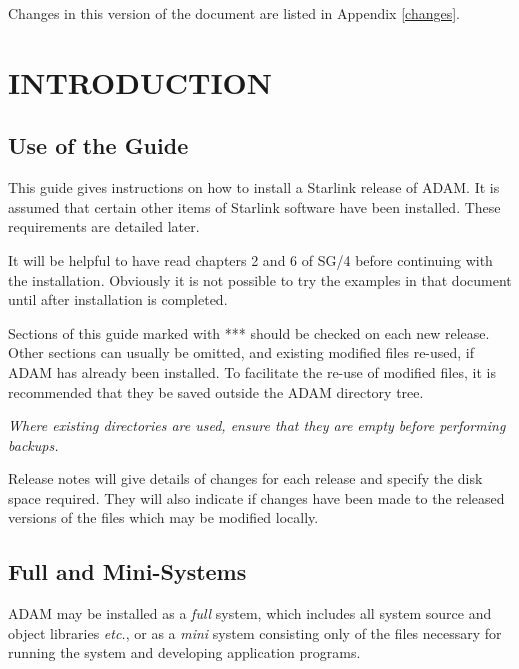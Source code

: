 Changes in this version of the document are listed in Appendix \ref{changes}.
\markright{\stardocname}
\newpage
\markright{\stardocname}

\small
  \setlength{\parskip}{0mm}
  \tableofcontents
  \setlength{\parskip}{\medskipamount}
  \markright{\stardocname}
\normalsize
\newpage
\section{INTRODUCTION}
\subsection{Use of the Guide}
This guide gives instructions on how to install a Starlink release
of ADAM. It is assumed that certain other items of
Starlink software have been installed.
These requirements are detailed later.

It will be helpful to have read chapters 2 and 6 of SG/4 \cite{sg4}
before continuing with the installation.
Obviously it is not possible to try the examples in that document until
after installation is completed.

Sections of this guide marked with *** should be checked on each new release.
Other sections can usually be omitted, and existing modified files re-used, if
ADAM has already been installed.
To facilitate the re-use of modified files, it is recommended that they be
saved outside the ADAM directory tree.

{\em Where existing directories are used, ensure that they are empty before
performing backups.}

Release notes \cite{ssn45} will give details of changes for each release and
specify the disk space required.
They will also indicate if changes have been made to the released versions
of the files which may be modified locally.

\subsection{Full and Mini-Systems}
ADAM may be installed as a {\em full} system, which includes all system source
and object libraries {\em etc.}, or as a {\em mini} system consisting only of
the files necessary for running the system and developing application programs.

